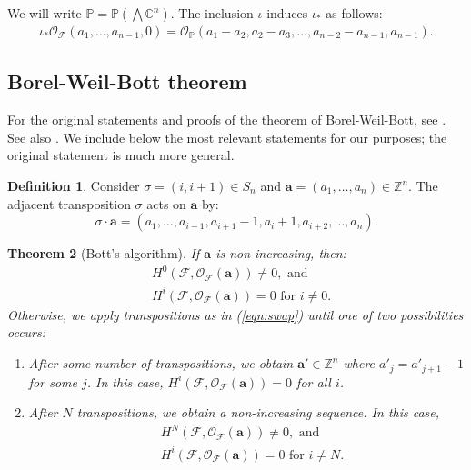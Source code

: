 \documentclass[12pt,reqno]{amsart}
\newtheorem{theorem}{Theorem}[section]
\theoremstyle{definition}
\newtheorem{definition}[theorem]{Definition}
\theoremstyle{remark}
\newcommand{\calF}{{\mathcal{F}}}
\newcommand{\calO}{{\mathcal{O}}}
\begin{document}
We will write $\mathbb P = \mathbb P \left(\bigwedge \mathbb C^n\right)$.  %
The inclusion $\iota$ induces $\iota_*$ as follows:
\begin{align*}
    \iota_*\calO_{\calF}(a_1,\ldots,a_{n-1},0) = \calO_{\mathbb P}(a_1-a_2,a_2-a_3,\ldots,a_{n-2}-a_{n-1},a_{n-1}).
\end{align*}

\subsection{Borel-Weil-Bott theorem}

For the original statements and proofs of the theorem of Borel-Weil-Bott, see \cite{SerreBorelWeil1995,Bott1957}.  See also \cite[\S 4.1]{Weyman2003}.  We include below the most relevant statements for our purposes; the original statement is much more general.

\begin{definition}
    Consider $\sigma = (i,i+1) \in S_n$ and $\mathbf a = (a_1,\ldots,a_n) \in \mathbb Z^n$.  The adjacent transposition $\sigma$ acts on $\mathbf a$ by:
    \begin{equation}\label{eqn:swap}
        \sigma\cdot\mathbf a = (a_1,\ldots,a_{i-1},a_{i+1}-1,a_i+1,a_{i+2},\ldots,a_n).
    \end{equation}
\end{definition}

\begin{theorem}[Bott's algorithm]\label{thm:bottAlg}
    If $\mathbf a$ is non-increasing, then:
    \begin{align*}
    &H^0(\calF,\calO_{\calF}(\mathbf a)) \neq 0, \text{ and } \\
    &H^i(\calF,\calO_{\calF}(\mathbf a)) = 0 \text{ for } i\neq 0.
    \end{align*}
    Otherwise, we apply transpositions as in (\ref{eqn:swap}) until one of two possibilities occurs:
    \begin{enumerate}
        \item After some number of transpositions, we obtain $\mathbf a' \in \mathbb Z^n$ where $a'_j = a'_{j+1}-1$ for some $j$.  In this case, $H^i(\calF,\calO_{\calF}(\mathbf a)) = 0 $ for all $i$.
        \item After $N$ transpositions, we obtain a non-increasing sequence.  In this case, 
            \begin{align*}
    &H^N(\calF,\calO_{\calF}(\mathbf a)) \neq 0, \text{ and } \\
    &H^i(\calF,\calO_{\calF}(\mathbf a)) = 0 \text{ for } i\neq N.
    \end{align*}
    \end{enumerate}
\end{theorem}
\end{document}
